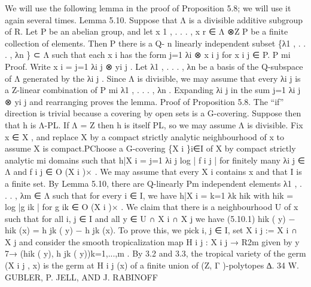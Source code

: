 \documentclass[
  10pt,
]{article}
\newenvironment{Shaded}{}{}
\newcommand{\NormalTok}[1]{#1}
\begin{document}
\begin{Shaded}
\begin{Highlighting}[]
\NormalTok{  We will use the following lemma in the proof of Proposition 5.8; we will use it again}
\NormalTok{several times.}
\NormalTok{Lemma 5.10. Suppose that Λ is a divisible additive subgroup of R. Let P be an abelian}
\NormalTok{group, and let x 1 , . . . , x r ∈ Λ ⊗Z P be a finite collection of elements. Then P            there is a Q{-}}
\NormalTok{                                                                                                   n}
\NormalTok{linearly independent subset \{λ1 , . . . , λn \} ⊂ Λ such that each x i has the form j=1 λi ⊗ x i j}
\NormalTok{for x i j ∈ P.}
\NormalTok{                       P mi}
\NormalTok{Proof. Write x i = j=1        λi j ⊗ yi j . Let λ1 , . . . , λn be a basis of the Q{-}subspace of Λ generated}
\NormalTok{by the λi j . Since Λ is divisible, we may assume that every λi j is a Z{-}linear combination of}
\NormalTok{                                                 P mi}
\NormalTok{λ1 , . . . , λn . Expanding λi j in the sum j=1            λi j ⊗ yi j and rearranging proves the lemma. }
\NormalTok{Proof of Proposition 5.8. The “if” direction is trivial because a covering by open sets is a}
\NormalTok{G{-}covering. Suppose then that h is Λ{-}PL. If Λ = Z then h is itself PL, so we may assume}
\NormalTok{Λ is divisible. Fix x ∈ X , and replace X by a compact strictly analytic neighbourhood of}
\NormalTok{x to assume X is compact.PChoose a G{-}covering \{X i \}i∈I of X by compact strictly analytic}
\NormalTok{                              mi}
\NormalTok{domains such that h|X i = j=1    λi j log | f i j | for finitely many λi j ∈ Λ and f i j ∈ O (X i )× . We}
\NormalTok{may assume that every X i contains x and that I is a finite set. By Lemma 5.10, there}
\NormalTok{are Q{-}linearly}
\NormalTok{       Pm       independent elements λ1 , . . . , λm ∈ Λ such that for every i ∈ I, we have}
\NormalTok{h|X i = k=1 λk hik with hik = log |g ik | for g ik ∈ O (X i )× .}
\NormalTok{  We claim that there is a neighbourhood U of x such that for all i, j ∈ I and all y ∈}
\NormalTok{U ∩ X i ∩ X j we have}
\NormalTok{(5.10.1)                         hik ( y) − hik (x) = h jk ( y) − h jk (x).}
\NormalTok{To prove this, we pick i, j ∈ I, set X i j := X i ∩ X j and consider the smooth tropicalization}
\NormalTok{map H i j : X i j → R2m given by y 7→ (hik ( y), h jk ( y))k=1,...,m . By 3.2 and 3.3, the tropical}
\NormalTok{variety of the germ (X i j , x) is the germ at H i j (x) of a finite union of (Z, Γ ){-}polytopes ∆.}
\NormalTok{34                                     W. GUBLER, P. JELL, AND J. RABINOFF}


\end{Highlighting}
\end{Shaded}
\end{document}
